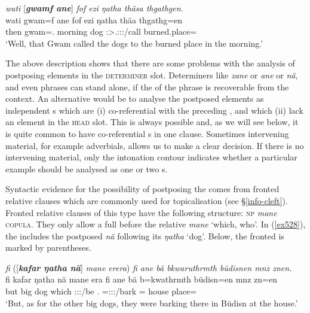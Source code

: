 \begin{exe}
	\ex \emph{wati} [\emph{\textbf{gwamf ane}}] \emph{fof ezi ŋatha thäsa thgathgen.}\\
	\gll wati gwam=f ane fof ezi ŋatha thäa thgathg=en\\
	then gwam=\Erg.\Sg{} \Dem{} \Emph{} morning dog \Stsg:\Sbj>\Tsg.\Masc:\Obj:\Pst:\Pfv/call {burned.place=\Loc}\\
	\trans `Well, that Gwam called the dogs to the burned place in the morning.'\\
	\label{ex523}
\end{exe}

The above description shows that there are some problems with the analysis of postposing elements in the \textsc{determiner} slot. Determiners like \emph{zane} or \emph{ane} or \emph{nä}, and even  phrases can stand alone, if the  of the phrase is recoverable from the context. An alternative would be to analyse the postposed elements as independent s which are (i) co-referential with the preceding , and which (ii) lack an element in the \textsc{head} slot. This is always possible and, as we will see below, it is quite common to have co-referential s in one clause. Sometimes intervening material, for example adverbials, allows us to make a clear decision. If there is no intervening material, only the intonation contour indicates whether a particular example should be analysed as one or two s.%

Syntactic evidence for the possibility of postposing the  comes from fronted relative clauses which are commonly used for topicalisation (see \S{}\ref{info-cleft}). Fronted relative clauses of this type have the following structure: \textsc{np} \emph{mane} \textsc{copula}. They only allow a full  before the relative  \emph{mane} `which, who'. In (\ref{ex528}), the  includes the postposed   \emph{nä} following its  \emph{ŋatha} `dog'. Below, the fronted  is marked by parentheses.

\begin{exe}
	\ex \emph{fi} ([\emph{\textbf{kafar ŋatha nä}}] \emph{mane erera}) \emph{fi ane bä bkwaruthrmth büdisnen mnz znen.}\\
	\gll fi kafar ŋatha nä mane era fi ane bä b=kwathrmth büdisn=en mnz zn=en\\
	but big dog \Indf{} which \Stpl:\Sbj:\Pst:\Ipfv/be \Third.\Abs{} \Dem{} \Med{} \Med=\Stpl:\Sbj:\Pst:\Dur/bark \Pl=\Loc{} house place=\Loc\\
	\trans `But, as for the other big dogs, they were barking there in Büdisn at the house.'
	\label{ex528}
\end{exe}

